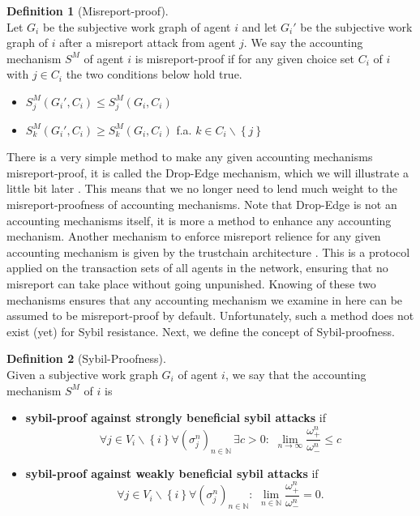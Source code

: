 \documentclass[11pt,a4paper]{report}
\theoremstyle{definition}
\newtheorem{definition}{Definition}[section]
\theoremstyle{theorem}
\theoremstyle{proposition}
\theoremstyle{corollary}
\theoremstyle{lemma}
\theoremstyle{example}
\theoremstyle{remark}
\begin{document}
\begin{definition}[Misreport-proof]\ \\
Let $G_i$ be the subjective work graph of agent $i$ and let $G_i'$ be the subjective work graph of $i$ after a misreport attack from agent $j$. We say the accounting mechanism $S^M$ of agent $i$ is misreport-proof if for any given choice set $C_i$ of $i$ with $j\in{}C_i$ the two conditions below hold true.
\begin{itemize}
\item $S^M_j(G_i',C_i)\leq{}S^M_j(G_i,C_i)$
\item $S^M_k(G_i',C_i)\geq{}S^M_k(G_i,C_i)$ f.a. $k\in{}C_i\backslash{}\left\lbrace{}j\right\rbrace$
\end{itemize}
\end{definition}
\noindent{}There is a very simple method to make any given accounting mechanisms misreport-proof, it is called the Drop-Edge mechanism, which we will illustrate a little bit later \cite{Accounting Mechanisms for Distributed Work Systems}. This means that we no longer need to lend much weight to the misreport-proofness of accounting mechanisms. Note that Drop-Edge is not an accounting mechanisms itself, it is more a method to enhance any accounting mechanism. Another mechanism to enforce misreport relience for any given accounting mechanism is given by the trustchain architecture \cite{TrustChain: A Sybil-resistant scalable blockchain}. This is a protocol applied on the transaction sets of all agents in the network, ensuring that no misreport can take place without going unpunished. Knowing of these two mechanisms ensures that any accounting mechanism we examine in here can be assumed to be misreport-proof by default. Unfortunately, such a method does not exist (yet) for Sybil resistance. Next, we define the concept of Sybil-proofness. \vspace{1em}\\

\begin{definition}[Sybil-Proofness]\ \\
Given a subjective work graph $G_i$ of agent $i$, we say that the accounting mechanism $S^M$ of $i$ is
\begin{itemize}
\item {\bf sybil-proof against strongly beneficial sybil attacks} if 
\[
\forall{}j\in{}V_i\backslash{}\left\lbrace{}i\right\rbrace \forall (\sigma^n_j)_{n\in\mathbb{N}}\,\exists{}c>0:\,\,\lim\limits_{n\rightarrow\infty}\frac{\omega^n_{+}}{\omega^n_{-}}\leq{}c
\]
\item {\bf sybil-proof against weakly beneficial sybil attacks} if 
\[
\forall{}j\in{}V_i\backslash{}\left\lbrace{}i\right\rbrace \forall (\sigma^n_j)_{n\in\mathbb{N}}:\,\,\lim\limits_{n\in\mathbb{N}}\frac{\omega^n_{+}}{\omega^n_{-}}=0.
\]
\end{itemize}
\end{definition}
\end{document}

